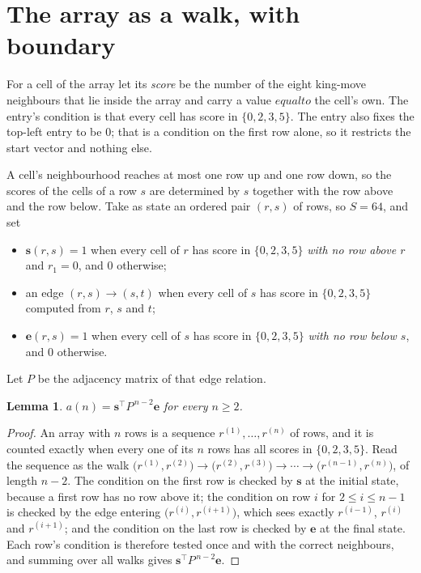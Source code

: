 \documentclass[11pt,a4paper]{article}
\theoremstyle{plain}
\newtheorem{lemma}[theorem]{Lemma}
\theoremstyle{definition}
\begin{document}
\section{The array as a walk, with boundary}

For a cell of the array let its \emph{score} be the number of the eight king-move neighbours that lie inside
the array and carry a value $equal to$ the cell's own. The entry's condition is that every cell
has score in $\{0,2,3,5\}$. The entry also fixes the top-left entry to be $0$; that is a condition on the first row alone, so it restricts the start vector and nothing else.

A cell's neighbourhood reaches at most one row up and one row down, so the scores of the
cells of a row $s$ are determined by $s$ together with the row above and the row below.
Take as state an ordered pair $(r,s)$ of rows, so $S=64$, and set
\begin{itemize}
\item $\mathbf{s}(r,s)=1$ when every cell of $r$ has score in $\{0,2,3,5\}$ \emph{with no row
above $r$} and $r_1=0$, and $0$ otherwise;
\item an edge $(r,s)\to(s,t)$ when every cell of $s$ has score in $\{0,2,3,5\}$ computed from
$r$, $s$ and $t$;
\item $\mathbf{e}(r,s)=1$ when every cell of $s$ has score in $\{0,2,3,5\}$ \emph{with no row
below $s$}, and $0$ otherwise.
\end{itemize}
Let $P$ be the adjacency matrix of that edge relation.

\begin{lemma}\label{lem:walk}
$a(n)=\mathbf{s}^{\!\top}P^{\,n-2}\mathbf{e}$ for every $n\ge2$.
\end{lemma}

\begin{proof}
An array with $n$ rows is a sequence $r^{(1)},\dots,r^{(n)}$ of rows, and it is counted
exactly when every one of its $n$ rows has all scores in $\{0,2,3,5\}$. Read the sequence as the
walk $\bigl(r^{(1)},r^{(2)}\bigr)\to\bigl(r^{(2)},r^{(3)}\bigr)\to\cdots\to
\bigl(r^{(n-1)},r^{(n)}\bigr)$, of length $n-2$. The condition on the first row is
checked by $\mathbf{s}$ at the initial state, because a first row has no row above it; the
condition on row $i$ for $2\le i\le n-1$ is checked by the edge entering
$\bigl(r^{(i)},r^{(i+1)}\bigr)$, which sees exactly $r^{(i-1)}$, $r^{(i)}$ and
$r^{(i+1)}$; and the condition on the last row is checked by $\mathbf{e}$ at the final
state. Each row's condition is therefore tested once and with the correct neighbours, and
summing over all walks gives $\mathbf{s}^{\!\top}P^{\,n-2}\mathbf{e}$.
\end{proof}
\end{document}

